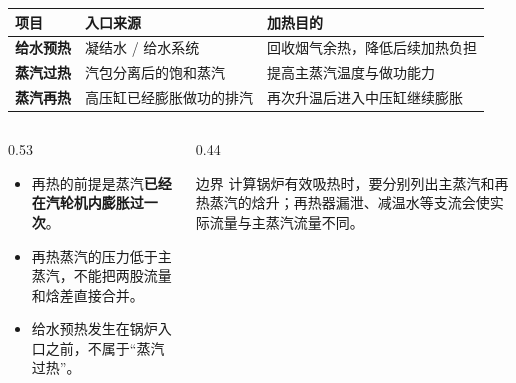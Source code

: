 \begin{frame}[t,shrink]{}
\begin{smalltab}
\begin{tabularx}{\linewidth}{@{}>{\bfseries}p{21mm}p{39mm}X@{}}
  \toprule
  项目 & 入口来源 & 加热目的\\
  \midrule
  给水预热 & 凝结水 / 给水系统 & 回收烟气余热，降低后续加热负担\\
  蒸汽过热 & 汽包分离后的饱和蒸汽 & 提高主蒸汽温度与做功能力\\
  蒸汽再热 & 高压缸已经膨胀做功的排汽 & 再次升温后进入中压缸继续膨胀\\
  \bottomrule
\end{tabularx}
\end{smalltab}
\begin{columns}[T,onlytextwidth]
\begin{column}{0.53\textwidth}
  \begin{itemize}
    \item 再热的前提是蒸汽\textbf{已经在汽轮机内膨胀过一次}。
    \item 再热蒸汽的压力低于主蒸汽，不能把两股流量和焓差直接合并。
    \item 给水预热发生在锅炉入口之前，不属于“蒸汽过热”。
  \end{itemize}
\end{column}
\begin{column}{0.44\textwidth}
  \begin{amberbox}{边界}
  \small 计算锅炉有效吸热时，要分别列出主蒸汽和再热蒸汽的焓升；再热器漏泄、减温水等支流会使实际流量与主蒸汽流量不同。
  \end{amberbox}
\end{column}
\end{columns}
\end{frame}

